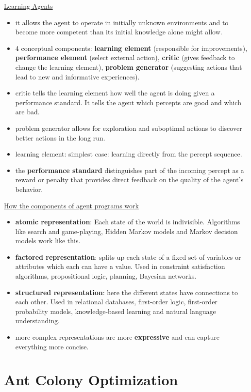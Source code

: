 \underline{Learning Agents}
\begin{itemize}[noitemsep,nolistsep]
	\item it allows the agent to operate in initially unknown environments and to become more competent than its initial knowledge alone might allow.
	\item 4 conceptual components: \textbf{learning element} (responsible for improvements), \textbf{performance element} (select external action), \textbf{critic} (gives feedback to change the learning element), \textbf{problem generator} (suggesting actions that lead to new and informative experiences).
	\item critic tells the learning element how well the agent is doing given a performance standard. It tells the agent which percepts are good and which are bad.
	\item problem generator allows for exploration and suboptimal actions to discover better actions in the long run.
	\item learning element: simplest case: learning directly from the percept sequence.
	\item the \textbf{performance standard} distinguishes part of the incoming percept as a reward or penalty that provides direct feedback on the quality of the agent’s behavior.
\end{itemize}

\underline{How the components of agent programs work}
\begin{itemize}[noitemsep,nolistsep]
	\item \textbf{atomic representation}: Each state of the world is indivisible. Algorithms like search and game-playing, Hidden Markov models and Markov decision models work like this.
	\item \textbf{factored representation}: splits up each state of a fixed set of variables or attributes which each can have a value. Used in constraint satisfaction algorithms, propositional logic, planning, Bayesian networks.
	\item \textbf{structured representation}: here the different states have connections to each other. Used in relational databases, first-order logic, first-order probability models, knowledge-based learning and natural language understanding.
	\item more complex representations are more \textbf{expressive} and can capture everything more concise.
\end{itemize}

\section{Ant Colony Optimization}

